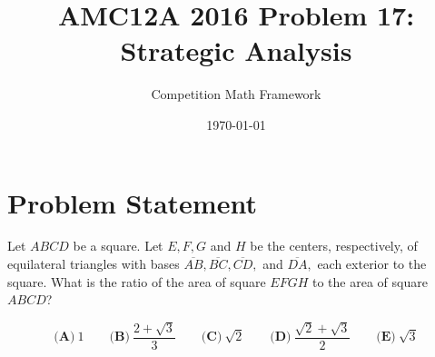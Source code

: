 \documentclass[]{article}
\begin{document}
\title{AMC12A 2016 Problem 17: Strategic Analysis}
\author{Competition Math Framework}
\date{\today}
\maketitle

\section*{Problem Statement}

Let $ABCD$ be a square. Let $E, F, G$ and $H$ be the centers, respectively, of equilateral triangles with bases $\overline{AB}, \overline{BC}, \overline{CD},$ and $\overline{DA},$ each exterior to the square. What is the ratio of the area of square $EFGH$ to the area of square $ABCD$?

$$\textbf{(A)}\ 1\qquad\textbf{(B)}\ \frac{2+\sqrt{3}}{3} \qquad\textbf{(C)}\ \sqrt{2} \qquad\textbf{(D)}\ \frac{\sqrt{2}+\sqrt{3}}{2} \qquad\textbf{(E)}\ \sqrt{3}$$
\end{document}

